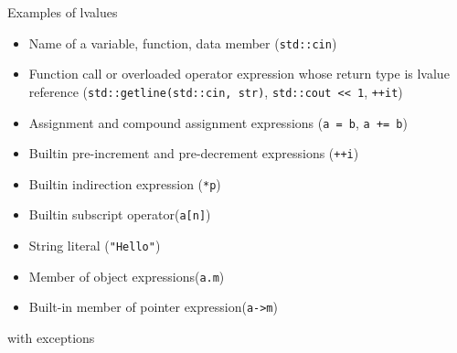 \begin{frame}{Examples of lvalues}{}
  \begin{examples}
    \begin{itemize}
    \item
      Name of a variable, function, data member (\lstinline!std::cin!)
    \item
      Function call or overloaded operator expression whose return type is lvalue reference (\lstinline!std::getline(std::cin, str)!, \lstinline!std::cout << 1!, \lstinline!++it!)
    \item
      Assignment and compound assignment expressions (\lstinline!a = b!, \lstinline!a += b!)
    \item
      Builtin pre-increment and pre-decrement expressions (\lstinline!++i!)
    \item
      Builtin indirection expression (\lstinline!*p!)
    \item
      Builtin subscript operator\manualfootnote (\lstinline!a[n]!)
    \item
      String literal (\lstinline!"Hello"!)
    \item
      Member of object expressions\manualfootnote (\lstinline!a.m!)
    \item
      Built-in member of pointer expression\manualfootnote (\lstinline!a->m!)
    \end{itemize}

    \raggedleft
    \footnotesize
    \manualfootnote with exceptions
  \end{examples}
\end{frame}

